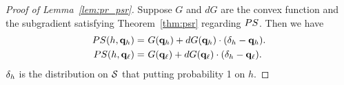\begin{proof}[Proof of Lemma~\ref{lem:pr_psr}]
Suppose $G$ and $dG$ are the convex function and the subgradient satisfying Theorem~\ref{thm:psr} regarding $PS$. Then we have 
    \begin{align*}
        PS(h, \mathbf{q}_h) = &\ G(\mathbf{q}_h) + dG(\mathbf{q}_h)\cdot(\delta_h - \mathbf{q}_h). \\
        PS(h, \mathbf{q}_{\ell}) = &\ G(\mathbf{q}_{\ell}) + dG(\mathbf{q}_{\ell})\cdot(\delta_h - \mathbf{q}_{\ell}). 
    \end{align*}
    $\delta_h$ is the distribution on $\mathcal{S}$ that putting probability 1 on $h$. 


\end{proof}

